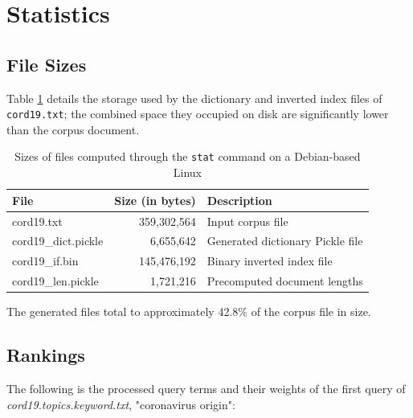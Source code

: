 \documentclass[11pt]{article}
\begin{document}
\section{Statistics}

\subsection{File Sizes}
Table \ref{sizes} details the storage used by the dictionary and inverted index files of \texttt{cord19.txt}; the combined space they occupied on disk are significantly lower than the corpus document.

\begin{table}[!ht]
    \caption{Sizes of files computed through the \texttt{stat} command on a Debian-based Linux}
    \begin{center} \label{sizes}

        \begin{tabular}{| l | r | l |}
        \hline
        \textbf{File} & \textbf{Size (in bytes)} & \textbf{Description} \\
        \hline
        cord19.txt & 359,302,564 & Input corpus file
        \\ \hline
        cord19\_dict.pickle & 6,655,642 & Generated dictionary Pickle file
        \\ \hline
        cord19\_if.bin & 145,476,192 & Binary inverted index file
        \\ \hline
        cord19\_len.pickle & 1,721,216 & Precomputed document lengths
        \\ \hline
        \end{tabular}

    \end{center}

\end{table}

The generated files total to approximately 42.8\% of the corpus file in size.

\subsection{Rankings}
The following is the processed query terms and their weights of the first query of \textit{cord19.topics.keyword.txt}, "coronavirus origin":

\end{document}
